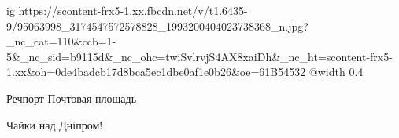  
 
 
 
 

\ifcmt
  ig https://scontent-frx5-1.xx.fbcdn.net/v/t1.6435-9/95063998_3174547572578828_1993200404023738368_n.jpg?_nc_cat=110&ccb=1-5&_nc_sid=b9115d&_nc_ohc=twiSvlrvjS4AX8xaiDh&_nc_ht=scontent-frx5-1.xx&oh=0de4badcb17d8bca5ec1dbe0af1e0b26&oe=61B54532
  @width 0.4
\fi

Речпорт Почтовая площадь

Чайки над Дніпром!
